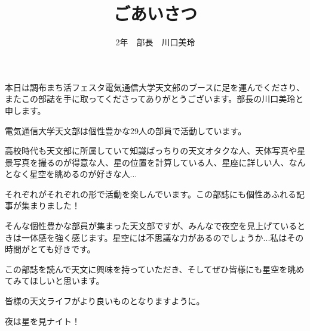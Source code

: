 \documentclass[a4paper,10pt]{jarticle}
\begin{document}
 
\title{ごあいさつ}
\author{2年　部長　川口美玲}
\date{}
\maketitle

\begin{center}


	\phantom{a}\par
	本日は調布まち活フェスタ電気通信大学天文部のブースに足を運んでくださり、またこの部誌を手に取ってくださってありがとうございます。部長の川口美玲と申します。
	
	
	\phantom{a}\par
	電気通信大学天文部は個性豊かな29人の部員で活動しています。
	
	
	\phantom{a}\par
	高校時代も天文部に所属していて知識ばっちりの天文オタクな人、天体写真や星景写真を撮るのが得意な人、星の位置を計算している人、星座に詳しい人、なんとなく星空を眺めるのが好きな人...
	
	
	\phantom{a}\par
	それぞれがそれぞれの形で活動を楽しんでいます。この部誌にも個性あふれる記事が集まりました！
	
	
	\phantom{a}\par
	そんな個性豊かな部員が集まった天文部ですが、みんなで夜空を見上げているときは一体感を強く感じます。星空には不思議な力があるのでしょうか...私はその時間がとても好きです。
	
	
	\phantom{a}\par
	この部誌を読んで天文に興味を持っていただき、そしてぜひ皆様にも星空を眺めてみてほしいと思います。
	
	
	\phantom{a}\par
	皆様の天文ライフがより良いものとなりますように。
	
	
	\phantom{a}\par
	夜は星を見ナイト！
	
	
\end{center}
\end{document}
